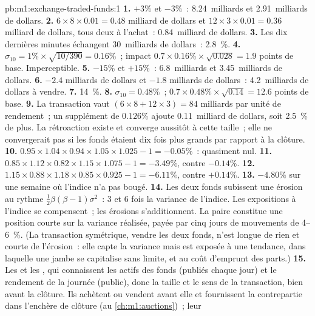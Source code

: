 \begin{solution}{pb:m1:exchange-traded-funds:1}
\textbf{1.} $+3\%$ et $-3\%$~: 8.24~milliards et 2.91~milliards de dollars.
\textbf{2.} $6 \times 8 \times 0.01 = 0.48$ milliard de dollars et $12 \times 3 \times
0.01 = 0.36$ milliard de dollars, tous deux à l'achat~: 0.84~milliard de dollars.
\textbf{3.} Les dix dernières minutes échangent 30~milliards de dollars~: 2.8~\%.
\textbf{4.} $\sigma_{10} = 1\% \times \sqrt{10/390} = 0.16\%$~; impact $0.7
\times 0.16\% \times \sqrt{0.028} = 1.9$ points de base. Imperceptible.
\textbf{5.} $-15\%$ et $+15\%$~: 6.8~milliards et 3.45~milliards de dollars.
\textbf{6.} $-2.4$ milliards de dollars et $-1.8$ milliards de dollars~: 4.2~milliards de dollars à vendre.
\textbf{7.} 14~\%.
\textbf{8.} $\sigma_{10} = 0.48\%$~; $0.7 \times 0.48\% \times \sqrt{0.14} =
12.6$ points de base.
\textbf{9.} La transaction vaut $(6 \times 8 + 12 \times 3) = 84$ milliards par unité de
rendement~; un supplément de $0.126\%$ ajoute 0.11~milliard de dollars, soit 2.5~\% de plus. La rétroaction
existe et converge aussitôt à cette taille~; elle ne convergerait pas si les fonds étaient dix
fois plus grands par rapport à la clôture.
\textbf{10.} $0.95 \times 1.04 \times 0.94 \times 1.05 \times 1.025 - 1 =
-0.05\%$~: quasiment nul.
\textbf{11.} $0.85 \times 1.12 \times 0.82 \times 1.15 \times 1.075 - 1 =
-3.49\%$, contre $-0.14\%$.
\textbf{12.} $1.15 \times 0.88 \times 1.18 \times 0.85 \times 0.925 - 1 =
-6.11\%$, contre $+0.14\%$.
\textbf{13.} $-4.80\%$ sur une semaine où l'indice n'a pas bougé.
\textbf{14.} Les deux fonds subissent une érosion au rythme $\tfrac12\beta(\beta-1)\sigma^2$~: 3
et 6 fois la variance de l'indice. Les expositions à l'indice se compensent~; les érosions s'additionnent.
La paire constitue une position courte sur la variance réalisée, payée par cinq jours de
mouvements de 4--6~\%. (La transaction symétrique, vendre les deux fonds, n'est longue de rien et
courte de l'érosion~: elle capte la variance mais est exposée à une tendance, dans laquelle une jambe
se capitalise sans limite, et au coût d'emprunt des parts.)
\textbf{15.} Les  et les , qui connaissent les actifs des fonds
(publiés chaque jour) et le rendement de la journée (public), donc la taille et le sens de
la transaction, bien avant la clôture. Ils achètent ou vendent avant elle et fournissent
la contrepartie dans l'enchère de clôture (au \cref{ch:m1:auctions})~; leur

\end{solution}
